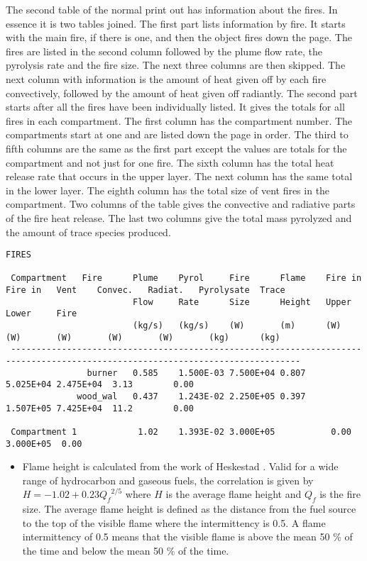 The second table of the normal print out has information about the fires.  In essence it is two tables joined.  The first part lists information by fire.  It starts with the main fire, if there is one, and then the object fires down the page.  The fires are listed in the second column followed by the plume flow rate, the pyrolysis rate and the fire size.  The next three columns are then skipped.  The next column with information is the amount of heat given off by each fire convectively, followed by the amount of heat given off radiantly.  The second part starts after all the fires have been individually listed.  It gives the totals for all fires in each compartment.  The first column has the compartment number.  The compartments start at one and are listed down the page in order.  The third to fifth columns are the same as the first part except the values are totals for the compartment and not just for one fire.  The sixth column has the total heat release rate that occurs in the upper layer.  The next column has the same total in the lower layer.  The eighth column has the total size of vent fires in the compartment.  Two columns of the table gives the convective and radiative parts of the fire heat release. The last two columns give the total mass pyrolyzed and the amount of trace species produced.

\begin{lstlisting}[basicstyle=\tiny]
 FIRES

 Compartment   Fire      Plume    Pyrol     Fire      Flame    Fire in  Fire in   Vent    Convec.   Radiat.   Pyrolysate  Trace
                         Flow     Rate      Size      Height   Upper    Lower     Fire
                         (kg/s)   (kg/s)    (W)       (m)      (W)      (W)       (W)       (W)       (W)       (kg)      (kg)
 -------------------------------------------------------------------------------------------------------------------------------
                burner   0.585    1.500E-03 7.500E+04 0.807                               5.025E+04 2.475E+04  3.13        0.00
              wood_wal   0.437    1.243E-02 2.250E+05 0.397                               1.507E+05 7.425E+04  11.2        0.00

 Compartment 1            1.02    1.393E-02 3.000E+05           0.00    3.000E+05  0.00
\end{lstlisting}

\begin{itemize}
\item Flame height is calculated from the work of Heskestad \cite{Heskestad:2002}. Valid for a wide range of hydrocarbon and gaseous fuels, the correlation is given by $H = -1.02 + 0.23{Q_f}^{2/5}$ where $H$ is the average flame height and $Q_f$ is the fire size. The average flame height is defined as the distance from the fuel source to the top of the visible flame where the intermittency is 0.5.  A flame intermittency of 0.5 means that the visible flame is above the mean 50 \% of the time and below the mean 50 \% of the time.
\end{itemize}

